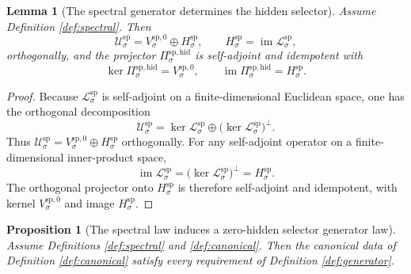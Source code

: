\documentclass[11pt]{article}
\newcommand{\SpecSpace}[1]{\mathcal U_{#1}^{\mathrm{sp}}}
\newcommand{\SpecOp}[1]{\mathcal L_{#1}^{\mathrm{sp}}}
\newcommand{\SpecZero}[1]{V_{#1}^{\mathrm{sp},0}}
\newcommand{\SpecHidden}[1]{H_{#1}^{\mathrm{sp}}}
\newcommand{\SpecProj}[1]{\Pi_{#1}^{\mathrm{sp,hid}}}
\newtheorem{lemma}{Lemma}
\newtheorem{proposition}{Proposition}
\begin{document}
\begin{lemma}[The spectral generator determines the hidden selector]
\label{lem:projection}
Assume Definition \ref{def:spectral}. Then
\[
\SpecSpace{\sigma}
=
\SpecZero{\sigma}\oplus\SpecHidden{\sigma},
\qquad
\SpecHidden{\sigma}=\operatorname{im}\SpecOp{\sigma},
\]
orthogonally, and the projector \(\SpecProj{\sigma}\) is self-adjoint and idempotent with
\[
\ker\SpecProj{\sigma}=\SpecZero{\sigma},
\qquad
\operatorname{im}\SpecProj{\sigma}=\SpecHidden{\sigma}.
\]
\end{lemma}

\begin{proof}
Because \(\SpecOp{\sigma}\) is self-adjoint on a finite-dimensional Euclidean space, one has the orthogonal decomposition
\[
\SpecSpace{\sigma}
=
\ker\SpecOp{\sigma}\oplus \bigl(\ker\SpecOp{\sigma}\bigr)^{\perp}.
\]
Thus \(\SpecSpace{\sigma}=\SpecZero{\sigma}\oplus\SpecHidden{\sigma}\) orthogonally. For any self-adjoint operator on a finite-dimensional inner-product space,
\[
\operatorname{im}\SpecOp{\sigma}
=
\bigl(\ker\SpecOp{\sigma}\bigr)^{\perp}
=
\SpecHidden{\sigma}.
\]
The orthogonal projector onto \(\SpecHidden{\sigma}\) is therefore self-adjoint and idempotent, with kernel \(\SpecZero{\sigma}\) and image \(\SpecHidden{\sigma}\).
\end{proof}

\begin{proposition}[The spectral law induces a zero-hidden selector generator law]
\label{prop:generator}
Assume Definitions \ref{def:spectral} and \ref{def:canonical}. Then the canonical data of Definition \ref{def:canonical} satisfy every requirement of Definition \ref{def:generator}.
\end{proposition}
\end{document}
